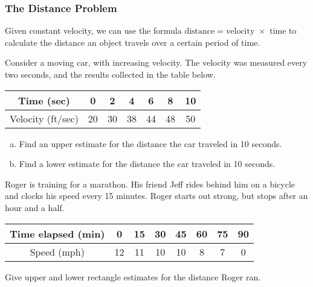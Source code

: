 \documentclass[notes]{subfiles}
\begin{document}
	\subsubsection*{The Distance Problem}
		Given constant velocity, we can use the formula $\text{distance} = \text{velocity }\times \text{ time}$ to calculate the distance an object travels over a certain period of time.  
		\begin{ex}
			Consider a moving car, with increasing velocity.  The velocity was measured every two seconds, and the results collected in the table below.
			\begin{center}
				{\renewcommand{\arraystretch}{1.2}
				\begin{tabular}{|c|c|c|c|c|c|c|} \hline
					Time (sec) & 0 & 2 & 4 & 6 & 8 & 10 \\ \hline
					Velocity (ft/sec) & 20 & 30 & 38 & 44 & 48 & 50 \\ \hline
				\end{tabular}
				}
			\end{center}
		\begin{enumerate}[(a)]
			\item Find an upper estimate for the distance the car traveled in 10 seconds.
				
			\item Find a lower estimate for the distance the car traveled in 10 seconds.
				
		\end{enumerate}
		\end{ex}	
			
		\begin{ex}
			Roger is training for a marathon.  His friend Jeff rides behind him on a bicycle and clocks his speed every 15 minutes.  Roger starts out strong, but stops after an hour and a half.  
			\begin{center}
				{\renewcommand{\arraystretch}{1.2}
				\begin{tabular}{|c|c|c|c|c|c|c|c|} \hline
					Time elapsed (min) & 0 & 15 & 30 & 45 & 60 & 75 & 90 \\ \hline
					Speed (mph) & 12 & 11 & 10 & 10 & 8 & 7 & 0 \\ \hline
				\end{tabular}
				}
			\end{center}
			Give upper and lower rectangle estimates for the distance Roger ran.
		\end{ex}
			\newpage
			
\end{document}
